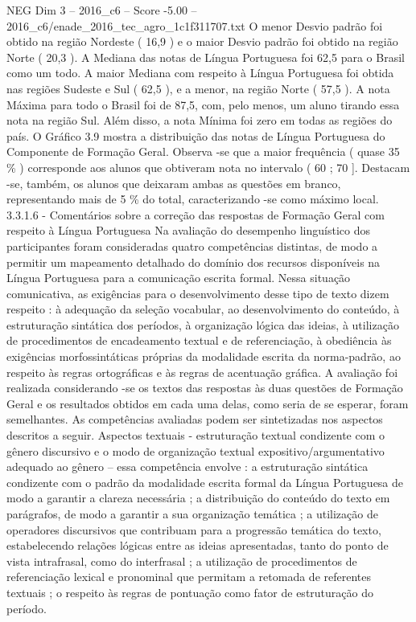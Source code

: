 \begin{textsample}{NEG Dim 3 – 2016\_c6 – Score -5.00 – 2016\_c6/enade\_2016\_tec\_agro\_1c1f311707.txt}
O menor Desvio padrão foi obtido na região Nordeste ( 16,9 ) e o maior Desvio padrão foi obtido na região Norte ( 20,3 ).
A Mediana das notas de Língua Portuguesa foi 62,5 para o Brasil como um todo.
A maior Mediana com respeito à Língua Portuguesa foi obtida nas regiões Sudeste e Sul ( 62,5 ), e a menor, na região Norte ( 57,5 ).
A nota Máxima para todo o Brasil foi de 87,5, com, pelo menos, um aluno tirando essa nota na região Sul.
Além disso, a nota Mínima foi zero em todas as regiões do país.
O Gráfico 3.9 mostra a distribuição das notas de Língua Portuguesa do Componente de Formação Geral.
Observa -se que a maior frequência ( quase 35 \% ) corresponde aos alunos que obtiveram nota no intervalo ( 60 ; 70 ].
Destacam -se, também, os alunos que deixaram ambas as questões em branco, representando mais de 5 \% do total, caracterizando -se como máximo local. 3.3.1.6 - Comentários sobre a correção das respostas de Formação Geral com respeito à Língua Portuguesa Na avaliação do desempenho linguístico dos participantes foram consideradas quatro competências distintas, de modo a permitir um mapeamento detalhado do domínio dos recursos disponíveis na Língua Portuguesa para a comunicação escrita formal.
Nessa situação comunicativa, as exigências para o desenvolvimento desse tipo de texto dizem respeito : à adequação da seleção vocabular, ao desenvolvimento do conteúdo, à estruturação sintática dos períodos, à organização lógica das ideias, à utilização de procedimentos de encadeamento textual e de referenciação, à obediência às exigências morfossintáticas próprias da modalidade escrita da norma-padrão, ao respeito às regras ortográficas e às regras de acentuação gráfica.
A avaliação foi realizada considerando -se os textos das respostas às duas questões de Formação Geral e os resultados obtidos em cada uma delas, como seria de se esperar, foram semelhantes.
As competências avaliadas podem ser sintetizadas nos aspectos descritos a seguir.
Aspectos textuais - estruturação textual condizente com o gênero discursivo e o modo de organização textual expositivo/argumentativo adequado ao gênero – essa competência envolve : a estruturação sintática condizente com o padrão da modalidade escrita formal da Língua Portuguesa de modo a garantir a clareza necessária ; a distribuição do conteúdo do texto em parágrafos, de modo a garantir a sua organização temática ; a utilização de operadores discursivos que contribuam para a progressão temática do texto, estabelecendo relações lógicas entre as ideias apresentadas, tanto do ponto de vista intrafrasal, como do interfrasal ; a utilização de procedimentos de referenciação lexical e pronominal que permitam a retomada de referentes textuais ; o respeito às regras de pontuação como fator de estruturação do período.

\end{textsample}
